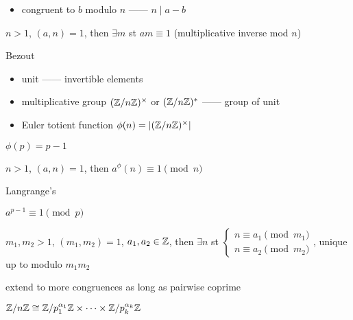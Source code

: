 \begin{itemize}
    \item congruent to $b$ modulo $n$ ------ $n \mid a - b$
\end{itemize}

\begin{lemma}
    $n  >1$, $(a, n) = 1$, then $\exists m$ st $am \equiv 1$ (multiplicative inverse mod $n$)
\end{lemma}
\begin{pf}
    Bezout
\end{pf}

\begin{itemize}
    \item unit ------ invertible elements
    \item multiplicative group $(\mathbb{Z}/n\mathbb{Z})^\times$ or $(\mathbb{Z}/n\mathbb{Z})^*$ ------ group of unit
    \item Euler totient function $\phi(n) = \left|(\mathbb{Z}/n\mathbb{Z})^\times  \right|$
\end{itemize}

\begin{fact}
    $\phi(p) = p - 1$
\end{fact}

\begin{thm}
    $n > 1$, $(a , n ) = 1$, then $a^\phi(n) \equiv 1 \pmod n$
\end{thm}
\begin{pf}
    Langrange's
\end{pf}

\begin{cor}
    $a^{p-1} \equiv 1 \pmod{p}$
\end{cor}

\begin{thm}
    $m_1, m_2 > 1$, $(m_1, m_2) = 1$, $a_1, a_2 \in \mathbb{Z}$, then $\exists n$ st
    $\begin{cases}
         n \equiv a_1 \pmod{m_1}\\
         n \equiv a_2 \pmod{m_2}
    \end{cases}$, unique up to modulo $m_{1}m_2$
\end{thm}

\begin{fact}
    extend to more congruences as long as pairwise coprime
\end{fact}

\begin{fact}
    $\mathbb{Z}/n\mathbb{Z} \cong \mathbb{Z}/p_1^{\alpha_1}\mathbb{Z} \times \cdots \times \mathbb{Z}/p_k^{\alpha_k}\mathbb{Z}$
\end{fact}


